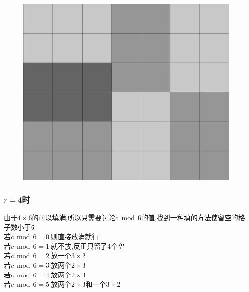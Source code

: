 \documentclass{beamer}
\begin{document}
\begin{frame}
\begin{figure}[htbp]
\begin{minipage}[t]{0.32\textwidth}
					\end{minipage}
					\begin{minipage}[t]{0.32\textwidth}
						\centering
						\includegraphics[height=0.7\textwidth]{pictures/2-6.png}
					\end{minipage}
				\end{figure}

			\end{frame}
			\begin{frame}\frametitle{$r=4$时}
				由于$4\times6$的可以填满,所以只需要讨论$c\bmod6$的值,找到一种填的方法使留空的格子数小于6\\
				若$c\bmod6=0$,则直接放满就行\\
				若$c\bmod6=1$,就不放,反正只留了4个空\\
				若$c\bmod6=2$,放一个$3\times2$\\
				若$c\bmod6=3$,放两个$2\times3$\\
				若$c\bmod6=4$,放两个$2\times3$\\
				若$c\bmod6=5$,放两个$2\times3$和一个$3\times2$\\
			\end{frame}
\end{document}
